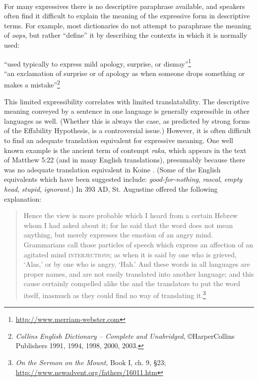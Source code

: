 \ea \label{ex:2.19}
\\
                       \z
\z


For many expressives there is no descriptive paraphrase available, and speakers often find it difficult to explain the meaning of the expressive form in descriptive terms. For example, most dictionaries do not attempt to paraphrase the meaning of \textit{oops}, but rather “define” it by describing the contexts in which it is normally used:


\ea

\ea “used typically to express mild apology, surprise, or dismay”\footnote{\url{http://www.merriam-webster.com}}\\
\ex “an exclamation of surprise or of apology as when someone drops something or makes a mistake”\footnote{\textit{Collins English Dictionary – Complete and Unabridged}, ©HarperCollins Publishers 1991, 1994, 1998, 2000, 2003.} \\ 
\z
\z


This limited expressibility correlates with limited translatability. The descriptive meaning conveyed by a sentence in one language is generally expressible in other languages as well. (Whether this is always the case, as predicted by strong forms of the Effability Hypothesis, is a controversial issue.) However, it is often difficult to find an adequate translation equivalent for expressive meaning. One well known example is the ancient  term of contempt \textit{raka}, which appears in the  text of Matthew 5:22 (and in many English translations), presumably because there was no adequate translation equivalent in Koine . (Some of the English equivalents which have been suggested include: \textit{good-for-nothing}, \textit{rascal}, \textit{empty head}, \textit{stupid}, \textit{ignorant}.) In 393 AD, St. Augustine offered the following explanation:


\begin{quote}
Hence the view is more probable which I heard from a certain Hebrew whom I had asked about it; for he said that the word does not mean anything, but merely expresses the emotion of an angry mind. Grammarians call those particles of speech which express an affection of an agitated mind \textsc{interjections}; as when it is said by one who is grieved, ‘Alas,’ or by one who is angry, ‘Hah.’ And these words in all languages are proper names, and are not easily translated into another language; and this cause certainly compelled alike the  and the  translators to put the word itself, inasmuch as they could find no way of translating it.\footnote{\textit{On the Sermon on the Mount}, Book I, ch. 9, §23; \url{http://www.newadvent.org/fathers/16011.htm}} 
\end{quote}


